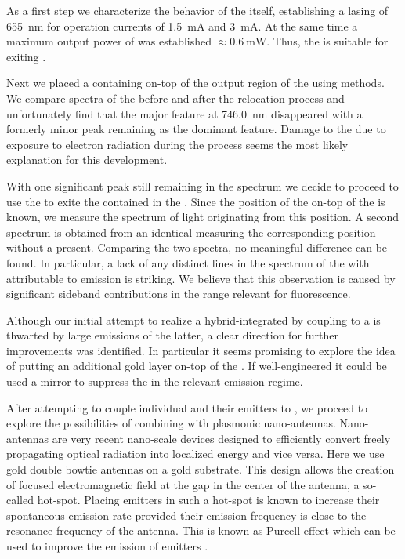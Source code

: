    As a first step we characterize the behavior of the \VCSEL itself, establishing a lasing \wl of \SI{655}{\nm} for operation currents of \SI{1.5}{\mA} and \SI{3}{\mA}. At the same time a maximum output power of was established $\approx \SI{0.6}{\mW}$. Thus, the \VCSEL  is suitable for exiting \sivs.

   Next we placed a \nd containing \sivs on-top of the output region of the \VCSEL using \pp methods. We compare spectra of the \nd before and after the relocation process and unfortunately find that the major \zpl feature at \SI{746.0}{nm} disappeared with a formerly minor peak remaining as the dominant feature. Damage to the \cc due to exposure to electron radiation during the \pp process seems the most likely explanation for this development.

   With one significant peak still remaining in the spectrum we decide to proceed to use the \Vcsel to exite the \sivs contained in the \nd.
   Since the position of the \nd on-top of the \VCSEL is known, we measure the spectrum of light originating from this position. A second spectrum is obtained from an identical \VCSEL measuring the corresponding position without a \nd present. Comparing the two spectra, no meaningful difference can be found. In particular, a lack of any distinct lines in the spectrum of the \VCSEL  with \nd attributable to \siv emission is striking. We believe that this observation is caused by significant \VCSEL sideband contributions in the \wl range relevant for \siv fluorescence.

   Although our initial attempt to realize a hybrid-integrated \sps by coupling \sivs to a \VCSEL is thwarted by large \sb emissions of the latter, a clear direction for further improvements was identified. In particular it seems promising to explore the idea of putting an additional gold layer on-top of the \VCSEL. If well-engineered it could be used a mirror to suppress the \VCSEL \sb in the relevant \siv emission regime.


   After attempting to couple individual \nds and their emitters to \VCSELs, we proceed to explore the possibilities of combining \sivs with plasmonic nano-antennas. Nano-antennas are very recent nano-scale devices designed to efficiently convert freely propagating optical radiation into localized energy and vice versa. Here we use gold double bowtie antennas on a gold substrate. This design allows the creation of focused electromagnetic field at the gap in the center of the antenna, a so-called hot-spot. Placing emitters in such a hot-spot is known to increase their spontaneous emission rate provided their emission frequency is close to the resonance frequency of the antenna. This is known as Purcell effect which can be used to improve the emission of emitters \cite{purcell1995spontaneous}.

